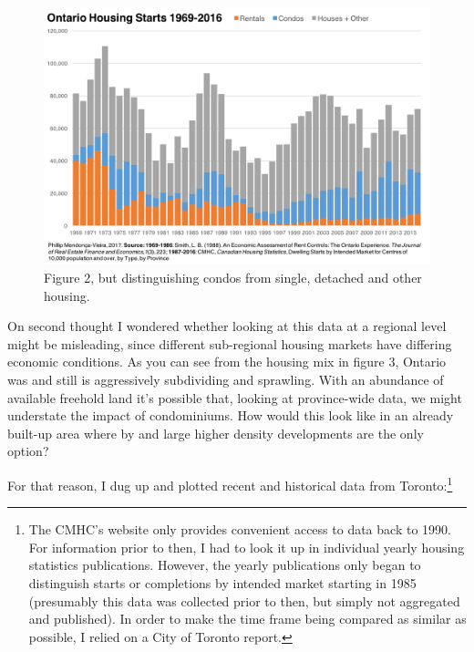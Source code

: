 \begin{figure}[ht]
\centering 
\includegraphics[width=\textwidth]{Ontario_Housing_Starts_1969-2016_With_Condos.png}
\caption[Ontario housing starts by intended market and condos 1969-2016]{Figure 2, but distinguishing condos from single, detached and other housing.
}
\label{fig:figure3} 
\end{figure}

On second thought I wondered whether looking at this data at a regional level might be misleading, since different sub-regional housing markets have differing economic conditions. As you can see from the housing mix in figure 3, Ontario was and still is aggressively subdividing and sprawling. With an abundance of available freehold land it's possible that, looking at province-wide data, we might understate the impact of condominiums. How would this look like in an already built-up area where by and large higher density developments are the only option? 

For that reason, I dug up and plotted recent and historical data from Toronto:\footnote{\label{^note-digging} The CMHC's website only provides convenient access to data back to 1990. For information prior to then, I had to look it up in individual yearly housing statistics publications. However, the yearly publications only began to distinguish starts or completions by intended market starting in 1985 (presumably this data was collected prior to then, but simply not aggregated and published). In order to make the time frame being compared as similar as possible, I relied on a City of Toronto report.}

\clearpage

